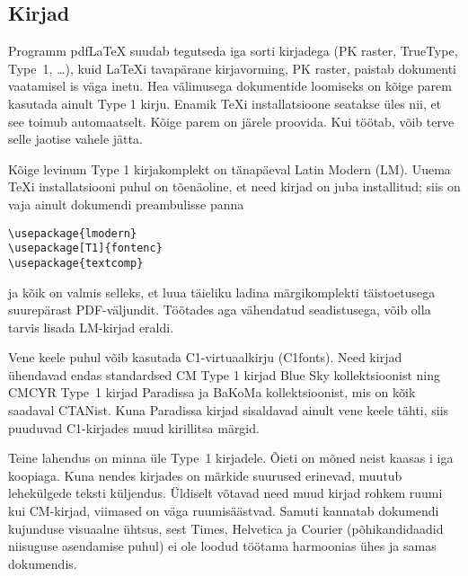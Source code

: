 \subsection{Kirjad}

Programm pdf\LaTeX{} suudab tegutseda iga sorti
kirjadega (PK raster, TrueType, \PSi{} Type~1, \dots), kuid \LaTeX i
tavapärane kirjavorming, PK raster, paistab dokumenti vaatamisel
is väga inetu. Hea välimusega dokumentide loomiseks
on kõige parem kasutada ainult \PSi{} Type 1 kirju. Enamik \TeX i
installatsioone seatakse üles nii, et see toimub automaatselt. Kõige
parem on järele proovida. Kui töötab, võib terve selle jaotise vahele
jätta.

Kõige levinum Type 1 kirjakomplekt on tänapäeval
Latin Modern (LM). Uuema \TeX i
installatsiooni puhul on tõenäoline, et need kirjad on juba installitud;
siis on vaja ainult dokumendi preambulisse panna
\begin{code}
\begin{verbatim}
\usepackage{lmodern}
\usepackage[T1]{fontenc}
\usepackage{textcomp}
\end{verbatim}
\end{code}
ja kõik on valmis selleks, et luua täieliku ladina märgikomplekti
täistoetusega suurepärast PDF-väljundit. Töötades aga vähendatud
seadistusega, võib olla tarvis lisada
LM-kirjad eraldi.

Vene keele puhul võib kasutada
C1-virtuaalkirju (C1fonts). Need kirjad
ühendavad endas standardsed CM Type 1 kirjad
Blue Sky kollektsioonist ning
CMCYR Type~1 kirjad
Paradissa ja
BaKoMa kollektsioonist, mis on kõik
saadaval CTANist. Kuna Paradissa kirjad sisaldavad ainult vene keele
tähti, siis puuduvad C1-kirjades muud kirillitsa
märgid.

Teine lahendus on minna üle \PSi{} Type~1 kirjadele. Õieti on mõned
neist kaasas i iga koopiaga. Kuna nendes kirjades on
märkide suurused erinevad, muutub lehekülgede teksti küljendus. Üldiselt
võtavad need muud kirjad rohkem ruumi kui
CM-kirjad, viimased on väga ruumisäästvad.
Samuti kannatab dokumendi kujunduse visuaalne ühtsus, sest
Times, Helvetica ja
Courier (põhikandidaadid niisuguse asendamise puhul)
ei ole loodud töötama harmoonias ühes ja samas dokumendis.

